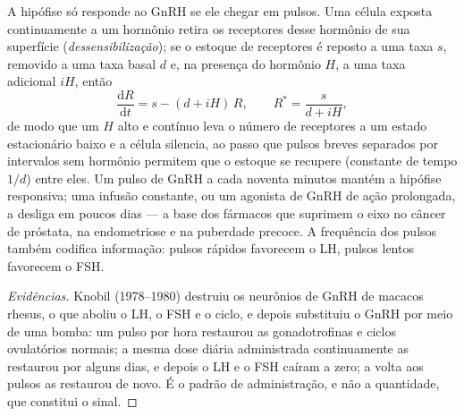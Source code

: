 \begin{proposition}\label{prop:b2:reproductive-hormones:pulses}
A hipófise só responde ao GnRH se ele chegar em pulsos. Uma célula
exposta continuamente a um hormônio retira os receptores desse hormônio
de sua superfície (\emph{dessensibilização}); se o estoque de
receptores é reposto a uma taxa $s$, removido a uma taxa basal $d$ e,
na presença do hormônio $H$, a uma taxa adicional $iH$, então
\[
\frac{\mathrm{d}R}{\mathrm{d}t} = s - (d + iH)\,R, \qquad R^* = \frac{s}{d + iH},
\]
de modo que um $H$ alto e contínuo leva o número de receptores a um
estado estacionário baixo e a célula silencia, ao passo que pulsos
breves separados por intervalos sem hormônio permitem que o estoque se
recupere (constante de tempo $1/d$) entre eles. Um pulso de GnRH a cada
noventa minutos mantém a hipófise responsiva; uma infusão constante, ou
um agonista de GnRH de ação prolongada, a desliga em poucos dias --- a
base dos fármacos que suprimem o eixo no câncer de próstata, na
endometriose e na puberdade precoce. A frequência dos pulsos também
codifica informação: pulsos rápidos favorecem o LH, pulsos lentos
favorecem o FSH.
\end{proposition}
\begin{proof}[Evidências]
Knobil (1978--1980) destruiu os neurônios de GnRH de macacos rhesus, o
que aboliu o LH, o FSH e o ciclo, e depois substituiu o GnRH por meio
de uma bomba: um pulso por hora restaurou as gonadotrofinas e ciclos
ovulatórios normais; a mesma dose diária administrada continuamente as
restaurou por alguns dias, e depois o LH e o FSH caíram a zero; a volta
aos pulsos as restaurou de novo. É o padrão de administração, e não a
quantidade, que constitui o sinal.
\end{proof}

